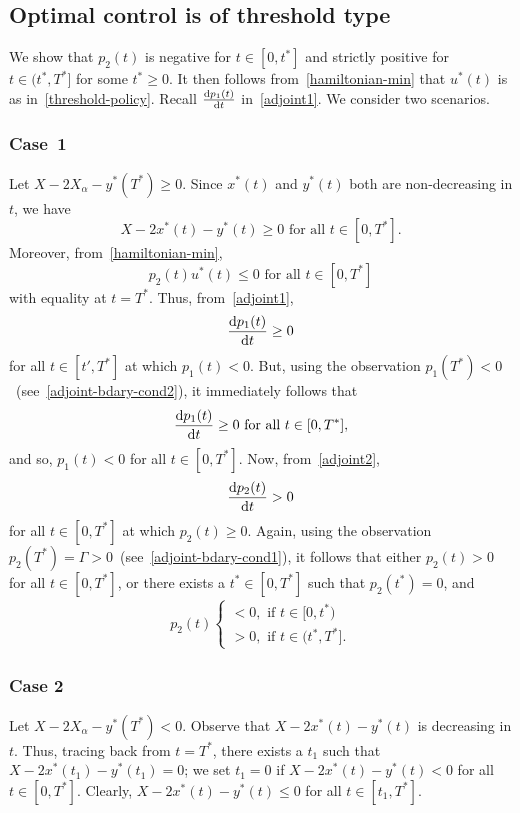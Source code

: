 \documentclass[10pt,journal,letterpaper]{IEEEtran}
\begin{document}
\begin{IEEEproof}
\subsection{Optimal control is of threshold type}
We show that $p_2(t)$ is negative for $t \in [0, t^{\ast}]$ and
strictly positive for $t \in (t^{\ast}, T^{\ast}]$ for some
$t^{\ast} \geq 0$. It then follows from~\eqref{hamiltonian-min} that
$u^{\ast}(t)$ is as in~\eqref{threshold-policy}. Recall $\frac{{\rm
d}p_1(t)}{{\rm d}t}$ in~\eqref{adjoint1}. We consider two scenarios.
\subsubsection{Case~1}
\label{form-part1} Let $X - 2X_{\alpha} - y^{\ast}(T^{\ast}) \geq
0$. Since $x^{\ast}(t)$ and $y^{\ast}(t)$ both are non-decreasing in
$t$, we have
\[
X - 2x^{\ast}(t) - y^{\ast}(t) \geq 0 \mbox{ for all } t \in [0,T^{\ast}].
\] 
Moreover, from~\eqref{hamiltonian-min},
\[
p_2(t)u^{\ast}(t) \leq 0 \mbox{ for all } t \in [0,T^{\ast}]
\]
with equality at $t = T^{\ast}$. Thus, from~\eqref{adjoint1},
\[
\frac{{\rm d}p_1(t)}{{\rm d}t} \geq 0 
\]
for all  $t \in [t',T^{\ast}]$ at which $p_1(t) < 0$. But, using the observation
$p_1(T^{\ast}) < 0$~(see~\eqref{adjoint-bdary-cond2}), it immediately follows that
\[
\frac{{\rm d}p_1(t)}{{\rm d}t} \geq 0 \mbox{ for all } t \in [0,T^{\ast}],
\]
and so, $p_1(t) < 0$ for all $t \in [0,T^{\ast}]$. Now, from~\eqref{adjoint2}, 
\[
\frac{{\rm d}p_2(t)}{{\rm d}t} > 0 
\]
for all  $t \in [0,T^{\ast}]$ at which $p_2(t) \geq 0$.  Again, using the observation
$p_2(T^{\ast}) = \Gamma > 0$~(see~\eqref{adjoint-bdary-cond1}), it follows that
either $p_2(t) > 0$ for all $t \in [0,T^{\ast}]$, 
or there exists a $t^{\ast} \in [0, T^{\ast}]$ such that $p_2(t^{\ast}) = 0$, and 
\begin{align*}
p_2(t) \left\{ \begin{array}{ll}
                 < 0, \mbox{ if } t \in [0, t^{\ast})\\
                 > 0, \mbox{ if } t \in (t^{\ast},T^{\ast}].\end{array} \right.
\end{align*}

\subsubsection{Case 2}
\label{form-part2}
 Let $X - 2X_{\alpha} - y^{\ast}(T^{\ast}) < 0$.
Observe that $X - 2x^{\ast}(t) - y^{\ast}(t)$ is decreasing in $t$.
Thus, tracing back from $t = T^{\ast}$, there exists a $t_1$ such
that $X - 2x^{\ast}(t_1) - y^{\ast}(t_1) = 0$; we set $t_1 = 0$ if
$X - 2x^{\ast}(t) - y^{\ast}(t) < 0$ for all $t \in [0, T^{\ast}]$.
Clearly, $X - 2x^{\ast}(t) - y^{\ast}(t) \leq 0$ for all $t \in
[t_1, T^{\ast}]$.


\end{IEEEproof}
\end{document}
